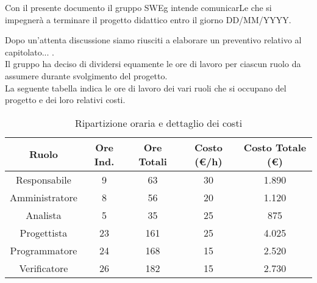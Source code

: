 Con il presente documento il gruppo SWEg intende comunicarLe che si impegner\`a a terminare il progetto didattico entro il giorno DD/MM/YYYY.

Dopo un'attenta discussione siamo riusciti a elaborare un preventivo relativo al capitolato... .\\
Il gruppo ha deciso di dividersi equamente le ore di lavoro per ciascun ruolo da assumere durante svolgimento del progetto.\\
La seguente tabella indica le ore di lavoro dei vari ruoli che si occupano del progetto e dei loro relativi costi.

\vspace{0.5cm}

\begin{table}[h]
\centering
\begin{tabular}{|c|c|c|c|c|}
\hline
Ruolo & Ore Ind. & Ore Totali & Costo (\euro/h) & Costo Totale (\euro) \\
\hline
Responsabile & 9 & 63 & 30 & 1.890 \\
\hline
Amministratore & 8 & 56 & 20 & 1.120 \\
\hline
Analista & 5 & 35 & 25 & 875 \\
\hline
Progettista & 23 & 161 & 25 & 4.025 \\
\hline
Programmatore & 24 & 168 & 15 & 2.520 \\
\hline
Verificatore & 26 & 182 & 15 & 2.730 \\
\hline
\end{tabular}
\caption{Ripartizione oraria e dettaglio dei costi}
\end{table}
\newpage
